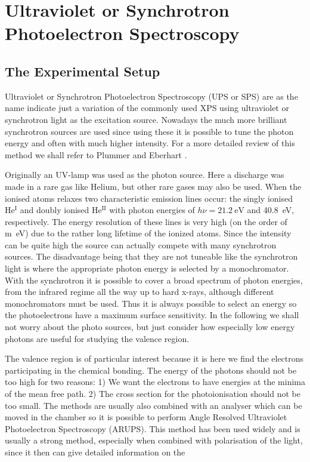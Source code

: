 \newpage
\chapter{Ultraviolet or Synchrotron Photoelectron Spectroscopy}
\section{The Experimental Setup}
Ultraviolet or Synchrotron  Photoelectron Spectroscopy (UPS or SPS)  are as the name indicate just a variation of the commonly used XPS using ultraviolet or synchrotron light as the excitation source. Nowadays the much more brilliant synchrotron sources are used since using these it is possible to tune the  photon energy and often with much higher intensity.  For a more detailed review of this method we shall refer to Plummer and Eberhart \cite{Plummer}.

Originally an UV-lamp was used as the photon source. Here a discharge was made in a rare gas like Helium, but other rare gases may also be used. When the ionised atoms relaxes two characteristic emission lines occur: the singly ionised He$^{\mathrm{I}}$  and doubly ionised He$^{\mathrm{II}}$ with photon energies of  $h\nu=\SI{21.2}{\electronvolt}$ and \SI{40.8}{\electronvolt}, respectively. The energy resolution of these lines is very high (on the order of \si{m\electronvolt}) due to the rather long lifetime of the ionized atoms. Since the intensity can be quite high the source can actually compete with many synchrotron sources. The disadvantage being that they are not tuneable like the synchrotron light is where the appropriate photon energy is selected by a monochromator. With the synchrotron it is possible to cover a broad spectrum of  photon energies, from the infrared regime all the way up to hard x-rays, although different monochromators must be used.  Thus it is always possible to select an energy so the photoelectrons have a maximum surface sensitivity. In the following we shall not worry about the photo sources, but just consider how especially low energy photons are useful for studying the valence region.

The valence region is of particular interest because it is here we find the electrons participating in the chemical bonding. The energy of the photons should not be too high for two reasons: 1) We want the electrons to have energies at the minima of the mean free path. 2) The cross section for the photoionisation should not be too small. The methods are usually also combined with an analyser which can be moved in the chamber so it is possible to perform Angle Resolved Ultraviolet Photoelectron Spectroscopy (ARUPS). This method has been used widely and is usually a strong method, especially when combined with polarisation of the light, since it then can give detailed information on the

